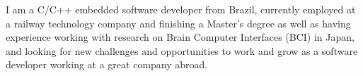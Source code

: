 \documentclass[9pt]{developercv} %
\begin{document}
\vspace{0.5cm}



\begin{minipage}[t]{0.4\textwidth} %
	\vspace{-\baselineskip} %
	I am a C/C++ embedded software developer from Brazil, currently employed at a railway
	technology company and finishing a Master's degree as well as having experience working
	with research on Brain Computer Interfaces (BCI) in Japan, and looking for new challenges 
	and opportunities to work and grow as a software developer working at a great company abroad.
\end{minipage}
\hfill %
\begin{minipage}[t]{0.5\textwidth} %
	\vspace{-\baselineskip} %
	\begin{barchart}{5.5}
	\end{barchart}
\end{minipage}

\begin{center}
\end{center}


\end{document}
